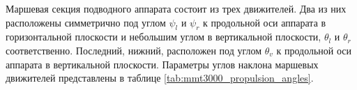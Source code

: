 Маршевая секция подводного аппарата состоит из трех движителей.
Два из них расположены симметрично под углом $\psi_l$ и $\psi_r$ к продольной оси аппарата в горизонтальной плоскости и небольшим углом в вертикальной плоскости, $\theta_l$ и $\theta_r$ соответственно.
Последний, нижний, расположен под углом $\theta_v$ к продольной оси аппарата в вертикальной плоскости.
Параметры углов наклона маршевых движителей представлены в таблице \ref{tab:mmt3000_propulsion_angles}.




